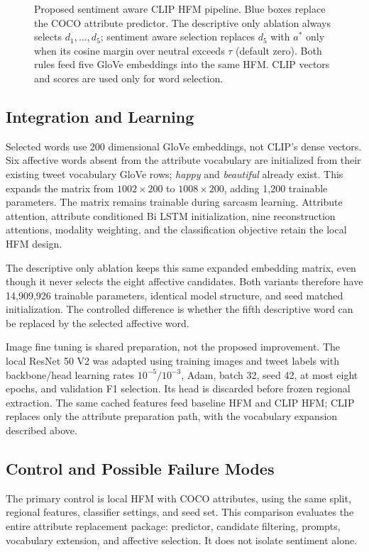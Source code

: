 \documentclass[conference]{IEEEtran}
\begin{document}
\begin{figure}[t]
\centering
\resizebox{0.98\textwidth}{!}{}
\caption{Proposed sentiment aware CLIP HFM pipeline. Blue boxes replace the COCO attribute predictor. The descriptive only ablation always selects $d_1,\ldots,d_5$; sentiment aware selection replaces $d_5$ with $a^*$ only when its cosine margin over neutral exceeds $\tau$ (default zero). Both rules feed five GloVe embeddings into the same HFM. CLIP vectors and scores are used only for word selection.}
\label{fig:clip}
\end{figure}

\subsection{Integration and Learning}
Selected words use 200 dimensional GloVe embeddings, not CLIP's dense vectors. Six affective words absent from the attribute vocabulary are initialized from their existing tweet vocabulary GloVe rows; \emph{happy} and \emph{beautiful} already exist. This expands the matrix from $1002\times200$ to $1008\times200$, adding 1,200 trainable parameters. The matrix remains trainable during sarcasm learning. Attribute attention, attribute conditioned Bi LSTM initialization, nine reconstruction attentions, modality weighting, and the classification objective retain the local HFM design.

The descriptive only ablation keeps this same expanded embedding matrix, even though it never selects the eight affective candidates. Both variants therefore have 14,909,926 trainable parameters, identical model structure, and seed matched initialization. The controlled difference is whether the fifth descriptive word can be replaced by the selected affective word.

Image fine tuning is shared preparation, not the proposed improvement. The local ResNet 50 V2 was adapted using training images and tweet labels with backbone/head learning rates $10^{-5}/10^{-3}$, Adam, batch 32, seed 42, at most eight epochs, and validation F1 selection. Its head is discarded before frozen regional extraction. The same cached features feed baseline HFM and CLIP HFM; CLIP replaces only the attribute preparation path, with the vocabulary expansion described above.

\subsection{Control and Possible Failure Modes}
The primary control is local HFM with COCO attributes, using the same split, regional features, classifier settings, and seed set. This comparison evaluates the entire attribute replacement package: predictor, candidate filtering, prompts, vocabulary extension, and affective selection. It does not isolate sentiment alone.
\end{document}

